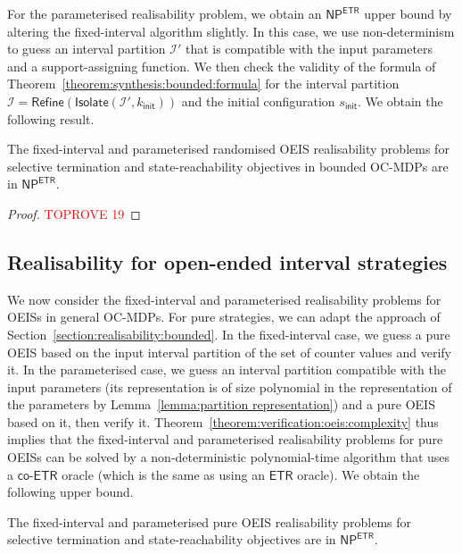 \documentclass[a4paper,UKenglish,cleveref,autoref,thm-restate,colorlinks]{lipics-v2021}
\newcommand{\init}{\mathsf{init}}
\newcommand{\np}{\textsf{NP}}
\newcommand{\etr}{\textsf{ETR}}
\newcommand{\coetr}{\textsf{co-ETR}}
\newcommand{\ocCount}{k}
\newcommand{\ocConfig}{s}
\newcommand{\intPart}{\mathcal{I}}
\begin{document}
For the parameterised realisability problem, we obtain an $\np^\etr$ upper bound by altering the fixed-interval algorithm slightly.
In this case, we use non-determinism to guess an interval partition $\intPart'$ that is compatible with the input parameters and a support-assigning function.
We then check the validity of the formula of Theorem~\ref{theorem:synthesis:bounded:formula} for the interval partition $\intPart=\mathsf{Refine}(\mathsf{Isolate}(\intPart', \ocCount_\init))$ and the initial configuration $\ocConfig_\init$.
We obtain the following result.

\begin{theorem}\label{theorem:realisability:bounded:randomised}
    The fixed-interval and parameterised randomised OEIS realisability problems for selective termination and state-reachability objectives in bounded OC-MDPs are in $\np^\etr$.
\end{theorem}
\begin{proof}\textcolor{red}{TOPROVE 19}\end{proof}
\subsection{Realisability for open-ended interval strategies}\label{section:realisability:oeis}

We now consider the fixed-interval and parameterised realisability problems for OEISs in general OC-MDPs.
For pure strategies, we can adapt the approach of Section~\ref{section:realisability:bounded}.
In the fixed-interval case, we guess a pure OEIS based on the input interval partition of the set of counter values and verify it.
In the parameterised case, we guess an interval partition compatible with the input parameters (its representation is of size polynomial in the representation of the parameters by Lemma~\ref{lemma:partition representation}) and a pure OEIS based on it, then verify it.
Theorem~\ref{theorem:verification:oeis:complexity} thus implies that the fixed-interval and parameterised realisability problems for pure OEISs can be solved by a non-deterministic polynomial-time algorithm that uses a $\coetr$ oracle (which is the same as using an $\etr$ oracle).
We obtain the following upper bound.
\begin{theorem}\label{theorem:realisability:oeis:pure}
  The fixed-interval and parameterised pure OEIS realisability problems for selective termination and state-reachability objectives are in $\np^\etr$.
\end{theorem}
\end{document}
